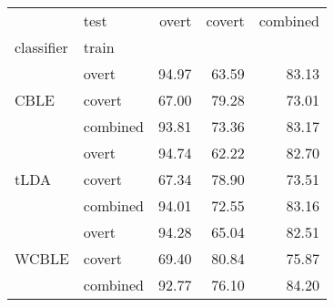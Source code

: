 \sffamily
\small
\begin{tabular}{@{}llrrr@{}}
\toprule
 & test & overt & covert & combined \\
classifier & train &  &  &  \\
\midrule
\multirow[t]{3}{*}{CBLE} & overt & 94.97 & 63.59 & 83.13 \\
 & covert & 67.00 & 79.28 & 73.01 \\
 & combined & 93.81 & 73.36 & 83.17 \\
\midrule
\multirow[t]{3}{*}{tLDA} & overt & 94.74 & 62.22 & 82.70 \\
 & covert & 67.34 & 78.90 & 73.51 \\
 & combined & 94.01 & 72.55 & 83.16 \\
 \midrule
\multirow[t]{3}{*}{WCBLE} & overt & 94.28 & 65.04 & 82.51 \\
 & covert & 69.40 & 80.84 & 75.87 \\
 & combined & 92.77 & 76.10 & 84.20 \\
\bottomrule
\end{tabular}
